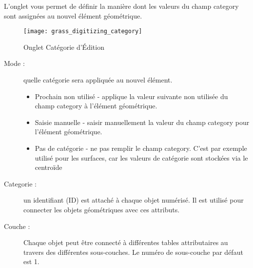 L'onglet  vous permet de définir la manière dont les valeurs du champ category sont assignées au nouvel élément géométrique.

\begin{figure}[ht]
 \begin{center}
  \texttt{[image: grass\_digitizing\_category]}
  \caption{Onglet Catégorie d'Édition \grass \nixcaption}\label{fig:grass_digitizing_category}
 \end{center}
\end{figure}

\begin{description}
\item[Mode :]quelle catégorie sera appliquée au nouvel élément.
\begin{itemize}[label=--]
\item Prochain non utilisé - applique la valeur suivante non utilisée du champ category à l'élément géométrique.
\item Saisie manuelle - saisir manuellement la valeur du champ category pour l'élément géométrique.
\item Pas de catégorie - ne pas remplir le champ category. C'est par exemple utilisé pour les surfaces, car les valeurs de catégorie sont stockées via le centroïde
\end{itemize}
\item[Categorie :]un identifiant (ID) est attaché à chaque objet numérisé. Il est utilisé pour connecter les objets géométriques avec ces attributs.
\item[Couche :]Chaque objet peut être connecté à différentes tables attributaires au travers des différentes sous-couches. Le numéro de sous-couche par défaut est 1.
\end{description}

